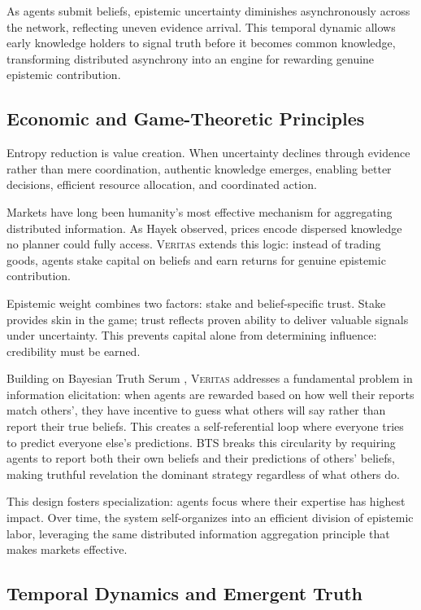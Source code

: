 \documentclass[11pt,a4paper]{article}
\newcommand{\veritas}{\textsc{Veritas}}
\begin{document}
As agents submit beliefs, epistemic uncertainty diminishes asynchronously across the network, reflecting uneven evidence arrival. This temporal dynamic allows early knowledge holders to signal truth before it becomes common knowledge, transforming distributed asynchrony into an engine for rewarding genuine epistemic contribution.

\subsection{Economic and Game-Theoretic Principles}

Entropy reduction is value creation. When uncertainty declines through evidence rather than mere coordination, authentic knowledge emerges, enabling better decisions, efficient resource allocation, and coordinated action.

Markets have long been humanity's most effective mechanism for aggregating distributed information. As Hayek \cite{hayek1945use} observed, prices encode dispersed knowledge no planner could fully access. \veritas{} extends this logic: instead of trading goods, agents stake capital on beliefs and earn returns for genuine epistemic contribution.

Epistemic weight combines two factors: stake and belief-specific trust. Stake provides skin in the game; trust reflects proven ability to deliver valuable signals under uncertainty. This prevents capital alone from determining influence: credibility must be earned.

Building on Bayesian Truth Serum \cite{prelec2004bayesian}, \veritas{} addresses a fundamental problem in information elicitation: when agents are rewarded based on how well their reports match others', they have incentive to guess what others will say rather than report their true beliefs. This creates a self-referential loop where everyone tries to predict everyone else's predictions. BTS breaks this circularity by requiring agents to report both their own beliefs and their predictions of others' beliefs, making truthful revelation the dominant strategy regardless of what others do.

This design fosters specialization: agents focus where their expertise has highest impact. Over time, the system self-organizes into an efficient division of epistemic labor, leveraging the same distributed information aggregation principle that makes markets effective.

\subsection{Temporal Dynamics and Emergent Truth}
\end{document}
